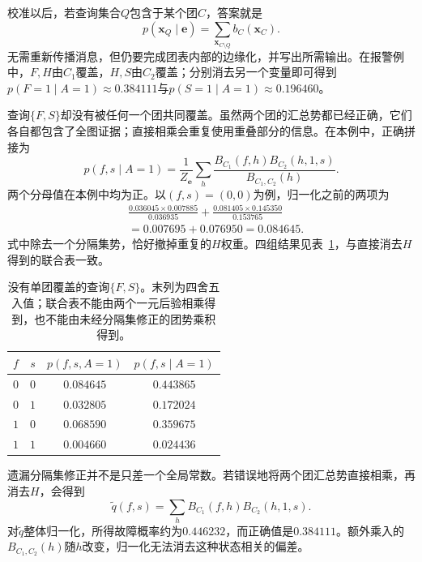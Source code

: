 校准以后，若查询集合$Q$包含于某个团$C$，答案就是
\begin{equation}
  p(\bm{x}_Q\mid\bm{e})
    =\sum_{\bm{x}_{C\setminus Q}}b_C(\bm{x}_C).
  \label{eq:pgm-junction-tree-covered-query}
\end{equation}
无需重新传播消息，但仍要完成团表内部的边缘化，并写出所需输出。在报警例中，$F,H$由$C_1$覆盖，$H,S$由$C_2$覆盖；分别消去另一个变量即可得到$p(F=1\mid A=1)\approx0.384111$与$p(S=1\mid A=1)\approx0.196460$。

查询$\{F,S\}$却没有被任何一个团共同覆盖。虽然两个团的汇总势都已经正确，它们各自都包含了全图证据；直接相乘会重复使用重叠部分的信息。在本例中，正确拼接为
\begin{equation}
  p(f,s\mid A=1)
    =\frac{1}{Z_{\bm{e}}}
      \sum_h
       \frac{B_{C_1}(f,h)B_{C_2}(h,1,s)}
            {B_{C_1,C_2}(h)}.
  \label{eq:pgm-junction-tree-cross-clique-device}
\end{equation}
两个分母值在本例中均为正。以$(f,s)=(0,0)$为例，归一化之前的两项为
\[
  \begin{aligned}
    &\frac{0.036045\times0.007885}{0.036935}
     +\frac{0.081405\times0.145350}{0.153765}\\
    &=0.007695+0.076950=0.084645.
  \end{aligned}
\]
式中除去一个分隔集势，恰好撤掉重复的$H$权重。四组结果见表~\ref{tab:pgm-junction-tree-cross-query}，与直接消去$H$得到的联合表一致。

\begin{table}[htbp]
  \centering
  \begin{tabular}{cccc}
    \toprule
    $f$ & $s$ & $p(f,s,A=1)$ & $p(f,s\mid A=1)$\\
    \midrule
    $0$ & $0$ & $0.084645$ & $0.443865$\\
    $0$ & $1$ & $0.032805$ & $0.172024$\\
    $1$ & $0$ & $0.068590$ & $0.359675$\\
    $1$ & $1$ & $0.004660$ & $0.024436$\\
    \bottomrule
  \end{tabular}
  \caption{没有单团覆盖的查询$\{F,S\}$。末列为四舍五入值；联合表不能由两个一元后验相乘得到，也不能由未经分隔集修正的团势乘积得到。}
  \label{tab:pgm-junction-tree-cross-query}
\end{table}

遗漏分隔集修正并不是只差一个全局常数。若错误地将两个团汇总势直接相乘，再消去$H$，会得到
\[
  \widetilde{q}(f,s)=\sum_h B_{C_1}(f,h)B_{C_2}(h,1,s).
\]
对$\widetilde{q}$整体归一化，所得故障概率约为$0.446232$，而正确值是$0.384111$。额外乘入的$B_{C_1,C_2}(h)$随$h$改变，归一化无法消去这种状态相关的偏差。

